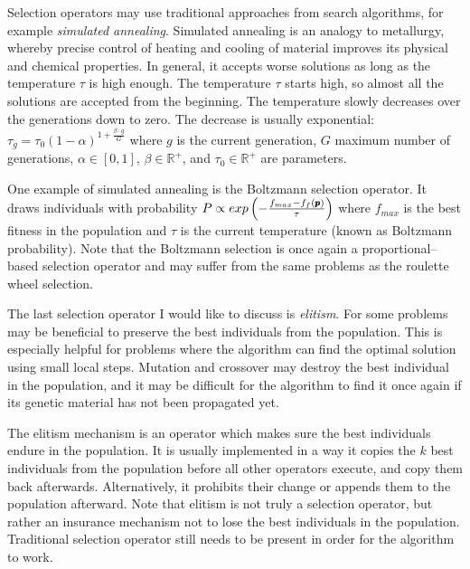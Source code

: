 Selection operators may use traditional approaches from search algorithms, for example \emph{simulated annealing}. Simulated annealing is an analogy to metallurgy, whereby precise control of heating and cooling of material improves its physical and chemical properties. In general, it accepts worse solutions as long as the temperature $\tau$ is high enough. The temperature $\tau$ starts high, so almost all the solutions are accepted from the beginning. The temperature slowly decreases over the generations down to zero. The decrease is usually exponential: \mbox{$\tau_g=\tau_0(1-\alpha)^{1+\frac{\beta\cdot g}{G}}$} where $g$ is the current generation, $G$ maximum number of generations, $\alpha\in\left[0,1\right]$, $\beta\in\mathbb{R}^+$, and $\tau_0\in\mathbb{R}^+$ are parameters. 

One example of simulated annealing is the Boltzmann selection operator. It draws individuals with probability 
$P\propto exp\left(-\frac{f_{max} - f_f(\pmb{p})}{\tau}\right)$
where $f_{max}$ is the best fitness in the population and $\tau$ is the current temperature (known as Boltzmann probability). Note that the Boltzmann selection is once again a proportional--based selection operator and may suffer from the same problems as the roulette wheel selection.

The last selection operator I would like to discuss is \emph{elitism}. For some problems may be beneficial to preserve the best individuals from the population. This is especially helpful for problems where the algorithm can find the optimal solution using small local steps. Mutation and crossover may destroy the best individual in the population, and it may be difficult for the algorithm to find it once again if its genetic material has not been propagated yet.

The elitism mechanism is an operator which makes sure the best individuals endure in the population. It is usually implemented in a way it copies the $k$ best individuals from the population before all other operators execute, and copy them back afterwards. Alternatively, it prohibits their change or appends them to the population afterward. Note that elitism is not truly a selection operator, but rather an insurance mechanism not to lose the best individuals in the population. Traditional selection operator still needs to be present in order for the algorithm to work. 




